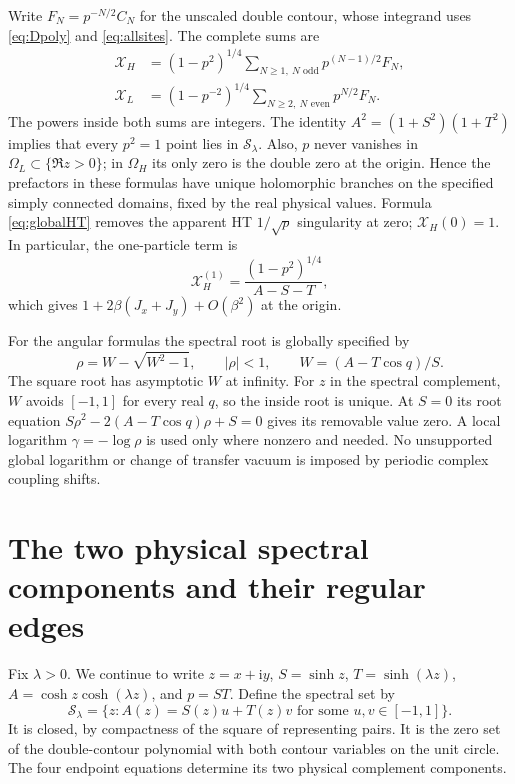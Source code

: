 \documentclass[11pt]{article}
\numberwithin{equation}{section}
\theoremstyle{definition}
\newcommand{\ii}{\mathrm i}
\newcommand{\cS}{\mathcal S}
\newcommand{\OH}{\Omega_H}
\newcommand{\OL}{\Omega_L}
\newcommand{\XH}{\mathcal X_H}
\newcommand{\XL}{\mathcal X_L}
\begin{document}
Write $F_N=p^{-N/2}C_N$ for the unscaled double contour, whose integrand
uses \eqref{eq:Dpoly} and \eqref{eq:allsites}. The complete sums are
\begin{align}
 \XH&=(1-p^2)^{1/4}\sum_{N\ge1,\ N\text{ odd}}p^{(N-1)/2}F_N,
                                                        \label{eq:globalHT}\\
 \XL&=(1-p^{-2})^{1/4}\sum_{N\ge2,\ N\text{ even}}p^{N/2}F_N.
                                                        \label{eq:globalLT}
\end{align}
The powers inside both sums are integers. The identity
$A^2=(1+S^2)(1+T^2)$ implies that every $p^2=1$ point lies in
$\cS_\lambda$. Also, $p$ never vanishes in $\OL\subset\{\Re z>0\}$;
in $\OH$ its only zero is the double zero at the origin. Hence the
prefactors in these formulas have unique holomorphic branches on the
specified simply connected domains, fixed by the real physical values.
Formula \eqref{eq:globalHT} removes the apparent HT $1/\sqrt p$
singularity at zero; $\XH(0)=1$. In particular, the one-particle term is
\[
 \XH^{(1)}=\frac{(1-p^2)^{1/4}}{A-S-T},
\]
which gives $1+2\beta(J_x+J_y)+O(\beta^2)$ at the origin.

For the angular formulas the spectral root is globally specified by
\[
 \rho=W-\sqrt{W^2-1},\qquad |\rho|<1,
 \qquad W=(A-T\cos q)/S.
\]
The square root has asymptotic $W$ at infinity. For $z$ in the spectral
complement, $W$ avoids $[-1,1]$ for every real $q$, so the inside root
is unique. At $S=0$ its root equation
$S\rho^2-2(A-T\cos q)\rho+S=0$ gives its removable value zero.
A local logarithm $\gamma=-\log\rho$ is used only where nonzero and
needed. No unsupported global logarithm or change of transfer vacuum
is imposed by periodic complex coupling shifts.



\section{The two physical spectral components and their regular edges}
\label{sec:geometry}

Fix $\lambda>0$.  We continue to write
$z=x+\ii y$, $S=\sinh z$, $T=\sinh(\lambda z)$,
$A=\cosh z\cosh(\lambda z)$, and $p=ST$.
Define the spectral set by
\begin{equation}\label{eq:spectralset}
 \cS_\lambda=\{z:A(z)=S(z)u+T(z)v
                       \text{ for some }u,v\in[-1,1]\}.
\end{equation}
It is closed, by compactness of the square of representing pairs.
It is the zero set of the double-contour polynomial with both contour
variables on the unit circle. The four endpoint equations determine
its two physical complement components.
\end{document}
